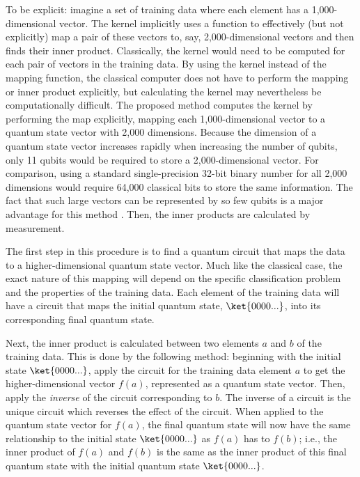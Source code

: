 \documentclass[%
 reprint,
nofootinbib,
 amsmath,amssymb,
 aps,
]{revtex4-2}
\begin{document}
To be explicit: imagine a set of training data where each element has a 1,000-dimensional vector. The kernel implicitly uses a function to effectively (but not explicitly) map a pair of these vectors to, say, 2,000-dimensional vectors and then finds their inner product. Classically, the kernel would need to be computed for each pair of vectors in the training data. By using the kernel instead of the mapping function, the classical computer does not have to perform the mapping or inner product explicitly, but calculating the kernel may nevertheless be computationally difficult. The proposed method computes the kernel by performing the map explicitly, mapping each 1,000-dimensional vector to a quantum state vector with 2,000 dimensions. Because the dimension of a quantum state vector increases rapidly when increasing the number of qubits, only 11 qubits would be required to store a 2,000-dimensional vector. For comparison, using a standard single-precision 32-bit binary number for all 2,000 dimensions would require 64,000 classical bits to store the same information. The fact that such large vectors can be represented by so few qubits is a major advantage for this method \cite{russo_quantum_2023}. Then, the inner products are calculated by measurement.

The first step in this procedure is to find a quantum circuit that maps the data to a higher-dimensional quantum state vector. Much like the classical case, the exact nature of this mapping will depend on the specific classification problem and the properties of the training data. Each element of the training data will have a circuit that maps the initial quantum state, $\ket{0000...}$, into its corresponding final quantum state.

Next, the inner product is calculated between two elements $a$ and $b$ of the training data. This is done by the following method: beginning with the initial state $\ket{0000...}$, apply the circuit for the training data element $a$ to get the higher-dimensional vector $f(a)$, represented as a quantum state vector. Then, apply the \textit{inverse} of the circuit corresponding to $b$. The inverse of a circuit is the unique circuit which reverses the effect of the circuit.
When applied to the quantum state vector for $f(a)$, the final quantum state will now have the same relationship to the initial state $\ket{0000...}$ as $f(a)$ has to $f(b)$; i.e., the inner product of $f(a)$ and $f(b)$ is the same as the inner product of this final quantum state with the initial quantum state $\ket{0000...}$.
\end{document}
